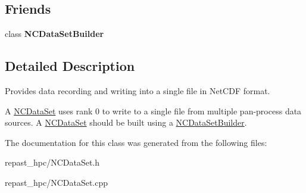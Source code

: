 \subsection*{Friends}
\begin{DoxyCompactItemize}
\item 
\hypertarget{classrepast_1_1_n_c_data_set_acabe4720b4e1263ea1efb10b32c8adf7}{class {\bfseries N\-C\-Data\-Set\-Builder}}\label{classrepast_1_1_n_c_data_set_acabe4720b4e1263ea1efb10b32c8adf7}

\end{DoxyCompactItemize}


\subsection{Detailed Description}
Provides data recording and writing into a single file in Net\-C\-D\-F format. 

A \hyperlink{classrepast_1_1_n_c_data_set}{N\-C\-Data\-Set} uses rank 0 to write to a single file from multiple pan-\/process data sources. A \hyperlink{classrepast_1_1_n_c_data_set}{N\-C\-Data\-Set} should be built using a \hyperlink{classrepast_1_1_n_c_data_set_builder}{N\-C\-Data\-Set\-Builder}. 

The documentation for this class was generated from the following files\-:\begin{DoxyCompactItemize}
\item 
repast\-\_\-hpc/N\-C\-Data\-Set.\-h\item 
repast\-\_\-hpc/N\-C\-Data\-Set.\-cpp\end{DoxyCompactItemize}
